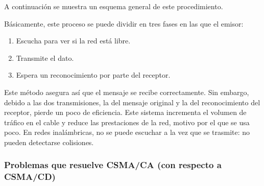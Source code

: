 \documentclass[a4paper]{article}
\begin{document}
	A continuación se muestra un esquema general de este procedimiento. 
	
	\noindent{}
	
	Básicamente, este proceso se puede dividir en tres fases en las que el emisor:
	
	\begin{enumerate}
		\item Escucha para ver si la red está libre.
		\item Transmite el dato.
		\item Espera un reconocimiento por parte del receptor.
	\end{enumerate}
	
	
	Este método asegura así que el mensaje se recibe correctamente. Sin embargo, debido a las dos transmisiones, la del mensaje original y la del reconocimiento del receptor, pierde un poco de eficiencia. Este sistema incrementa el volumen de tráfico en el cable y reduce las prestaciones de la red, motivo por el que se usa poco. En redes inalámbricas, no se puede escuchar a la vez que se trasmite: no pueden detectarse colisiones. 
	
	\subsubsection{Problemas que resuelve CSMA/CA (con respecto a CSMA/CD)}
	
\end{document}

